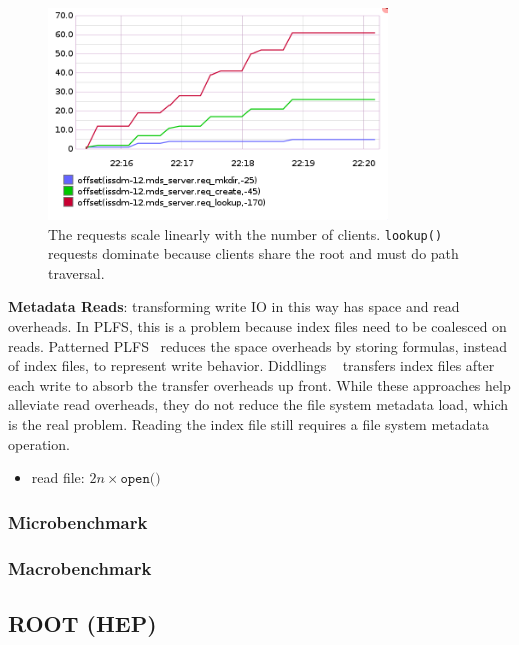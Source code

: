 \begin{figure}[tb]
\centering
  \includegraphics[width=90mm]{figures/prob_reqs.png} 
  \caption{The requests scale linearly with the number of clients.
  \texttt{lookup()} requests dominate because clients share the root and must do
  path traversal.
  }\label{fig:arch}
\end{figure}

\textbf{Metadata Reads}: transforming write IO in this way has space and read
overheads. In PLFS, this is a problem because index files need to be coalesced
on reads.  Patterned PLFS~\cite{he:hpdc13-plfs-patterns} reduces the space
overheads by storing formulas, instead of index files, to represent write
behavior. Diddlings ~\cite{grider:pc17-diddlings} transfers index files after
each write to absorb the transfer overheads up front. While these approaches
help alleviate read overheads, they do not reduce the file system metadata
load, which is the real problem. Reading the index file still requires a file
system metadata operation.

\begin{itemize}
  \item read file: \(2n \times \texttt{open()}\) 
\end{itemize}

\subsubsection{Microbenchmark}
\subsubsection{Macrobenchmark}

\subsection{ROOT (HEP)}

